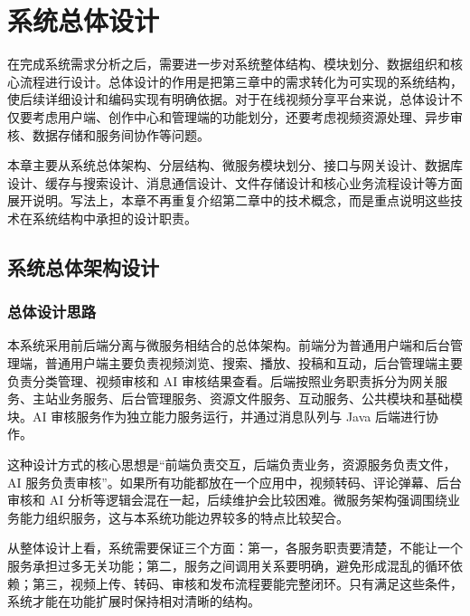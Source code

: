 
\chapter{系统总体设计}
\label{chap:system-overall-design}

在完成系统需求分析之后，需要进一步对系统整体结构、模块划分、数据组织和核心流程进行设计。总体设计的作用是把第三章中的需求转化为可实现的系统结构，使后续详细设计和编码实现有明确依据。对于在线视频分享平台来说，总体设计不仅要考虑用户端、创作中心和管理端的功能划分，还要考虑视频资源处理、异步审核、数据存储和服务间协作等问题。

本章主要从系统总体架构、分层结构、微服务模块划分、接口与网关设计、数据库设计、缓存与搜索设计、消息通信设计、文件存储设计和核心业务流程设计等方面展开说明。写法上，本章不再重复介绍第二章中的技术概念，而是重点说明这些技术在系统结构中承担的设计职责。

\section{系统总体架构设计}
\label{sec:overall-architecture-design}

\subsection{总体设计思路}
\label{subsec:overall-design-idea}

本系统采用前后端分离与微服务相结合的总体架构。前端分为普通用户端和后台管理端，普通用户端主要负责视频浏览、搜索、播放、投稿和互动，后台管理端主要负责分类管理、视频审核和 AI 审核结果查看。后端按照业务职责拆分为网关服务、主站业务服务、后台管理服务、资源文件服务、互动服务、公共模块和基础模块。AI 审核服务作为独立能力服务运行，并通过消息队列与 Java 后端进行协作。

这种设计方式的核心思想是“前端负责交互，后端负责业务，资源服务负责文件，AI 服务负责审核”。如果所有功能都放在一个应用中，视频转码、评论弹幕、后台审核和 AI 分析等逻辑会混在一起，后续维护会比较困难。微服务架构强调围绕业务能力组织服务，这与本系统功能边界较多的特点比较契合\cite{lewis2014microservices}。

从整体设计上看，系统需要保证三个方面：第一，各服务职责要清楚，不能让一个服务承担过多无关功能；第二，服务之间调用关系要明确，避免形成混乱的循环依赖；第三，视频上传、转码、审核和发布流程要能完整闭环。只有满足这些条件，系统才能在功能扩展时保持相对清晰的结构。

